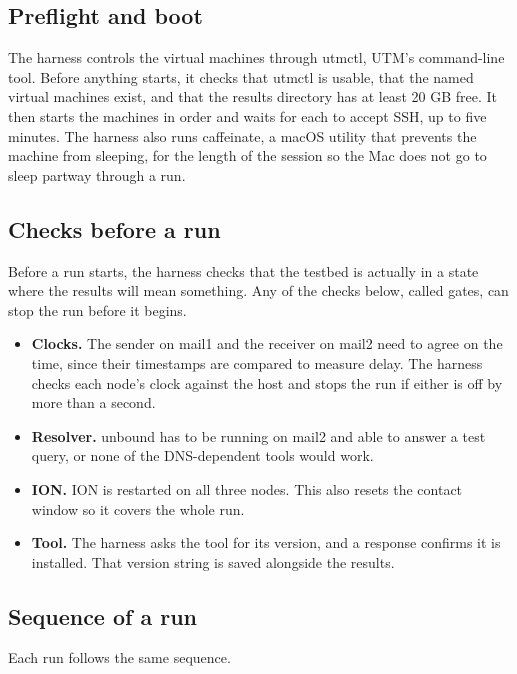 \subsection{Preflight and boot}

The harness controls the virtual machines through utmctl, UTM's command-line tool. Before anything starts, it checks that utmctl is usable, that the named virtual machines exist, and that the results directory has at least 20 GB free. It then starts the machines in order and waits for each to accept SSH, up to
five minutes. The harness also runs caffeinate, a macOS utility that prevents the machine from sleeping, for the length of the session so the Mac does not go to sleep partway through a run.

\subsection{Checks before a run}
\label{sec:test_harness_verification}

Before a run starts, the harness checks that the testbed is actually in a state where the results will mean something. Any of the checks below, called gates, can stop the run before it begins.

\begin{itemize}
    \item \textbf{Clocks.} The sender on mail1 and the receiver on mail2 need to agree on the time, since their timestamps are compared to measure delay. The harness checks each node's clock against the host and stops the run if either is off by more than a second.
    \item \textbf{Resolver.} unbound has to be running on mail2 and able to answer a test query, or none of the DNS-dependent tools would work.
    \item \textbf{ION.} ION is restarted on all three nodes. This also resets the contact window so it covers the whole run.
    \item \textbf{Tool.} The harness asks the tool for its version, and a response confirms it is installed. That version string is saved alongside the results.
\end{itemize}

\subsection{Sequence of a run}
\label{sec:harness-agents}

Each run follows the same sequence.

